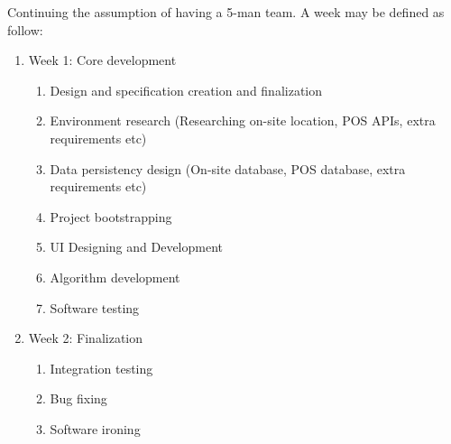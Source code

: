 \documentclass[
  11pt, %
]{assignment}
\begin{document}
Continuing the assumption of having a 5-man team. A week may be defined as follow:

\begin{enumerate}
  \item Week 1: Core development
        \begin{enumerate}
          \item Design and specification creation and finalization
          \item Environment research (Researching on-site location, POS APIs, extra requirements etc)
          \item Data persistency design (On-site database, POS database, extra requirements etc)
          \item Project bootstrapping
          \item UI Designing and Development
          \item Algorithm development
          \item Software testing
        \end{enumerate}

  \item Week 2: Finalization
        \begin{enumerate}
          \item Integration testing
          \item Bug fixing
          \item Software ironing
        \end{enumerate}
\end{enumerate}
\end{document}
